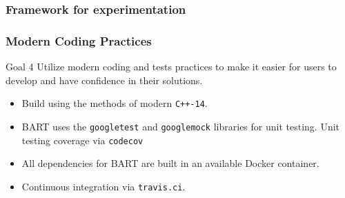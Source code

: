 \documentclass[xcolor=x11names, compress]{beamer}
\begin{document}
\begin{frame}
  \frametitle{Framework for experimentation}
\end{frame}

\begin{frame}
  \frametitle{Modern Coding Practices}
  \begin{block}{Goal 4}
    Utilize modern coding and tests practices to make it
    easier for users to develop and have confidence in their solutions.
  \end{block}
  \begin{itemize}
  \item Build using the methods of modern \texttt{C++-14}.
  \item BART uses the \texttt{googletest} and \texttt{googlemock}
    libraries for unit testing. Unit testing coverage via \texttt{codecov}
  \item All dependencies for BART are built in an available Docker
    container.
  \item Continuous integration via \texttt{travis.ci}.
  \end{itemize}  
    
\end{frame}
\end{document}
